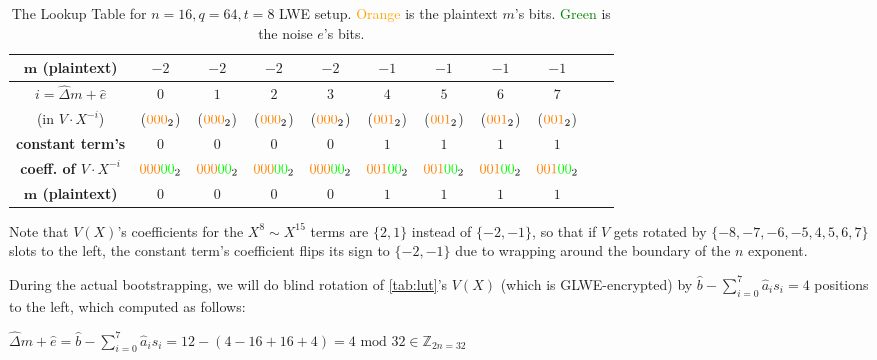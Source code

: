 \begin{enumerate}
\begin{table}[h]
{\begin{tabular}{|c||c|c|c|c|c|c|c|c|c|c|}
\hline
\textbf{$\bm{m}$ (plaintext)} & $-2$ & $-2$ & $-2$ & $-2$ & $-1$ & $-1$ & $-1$ & $-1$ \\
\hline
\hline
\textbf{\boldmath$i = \hat{\Delta}m + \hat{e}$} & $0$ & $1$ & $2$ & $3$ & $4$ & $5$ & $6$ & $7$ \\
(in $V \cdot X^{-i}$) & ($\textcolor{cyan}{}\textcolor{orange}{000}_2$)& ($\textcolor{cyan}{}\textcolor{orange}{000}_2$)& ($\textcolor{cyan}{}\textcolor{orange}{000}_2$)& ($\textcolor{cyan}{}\textcolor{orange}{000}_2$)& ($\textcolor{cyan}{}\textcolor{orange}{001}_2$)& ($\textcolor{cyan}{}\textcolor{orange}{001}_2$)& ($\textcolor{cyan}{}\textcolor{orange}{001}_2$)&($\textcolor{cyan}{}\textcolor{orange}{001}_2$)\\
\hline
\textbf{constant term's} & $0$ & $0$ & $0$ & $0$ & $1$ & $1$ & $1$ & $1$ \\
\textbf{coeff. of $V\cdot X^{-i}$}& $\textcolor{orange}{000}\textcolor{green}{00}_2$ & $\textcolor{orange}{000}\textcolor{green}{00}_2$ & $\textcolor{orange}{000}\textcolor{green}{00}_2$ & $\textcolor{orange}{000}\textcolor{green}{00}_2$ & $\textcolor{orange}{001}\textcolor{green}{00}_2$ & $\textcolor{orange}{001}\textcolor{green}{00}_2$ & $\textcolor{orange}{001}\textcolor{green}{00}_2$ & $\textcolor{orange}{001}\textcolor{green}{00}_2$ \\
\hline
\textbf{$\bm{m}$ (plaintext)} & $0$ & $0$ & $0$ & $0$ & $1$ & $1$ & $1$ & $1$ \\
\hline
\end{tabular}}
\centering
\caption{The Lookup Table for $n=16, q=64, t=8$ LWE setup.
\textcolor{orange}{Orange} is the plaintext $m$'s bits. \textcolor{green}{Green} is the noise $e$'s bits. %
}
\label{tab:lut}
\end{table}

Note that $V(X)$'s coefficients for the $X^8 \sim X^{15}$ terms are $\{2, 1\}$ instead of $\{-2, -1\}$, so that if $V$ gets rotated by $\{-8,-7,-6,-5,4,5,6,7\}$ slots to the left, the constant term's coefficient flips its sign to $\{-2, -1\}$ due to wrapping around the boundary of the $n$ exponent. 

During the actual bootstrapping, we will do blind rotation of \autoref{tab:lut}'s $V(X)$ (which is GLWE-encrypted) by $\hat{b} - \sum\limits_{i=0}^{7}\hat{a}_is_i = 4$ positions to the left, which computed as follows:

$\hat\Delta m + \hat e = \hat{b} - \sum\limits_{i=0}^{7}\hat{a}_is_i = 12 - (4 - 16 + 16 + 4) = 4 \text{ mod 32} \in \mathbb{Z}_{2n=32}$ 



\end{enumerate}
